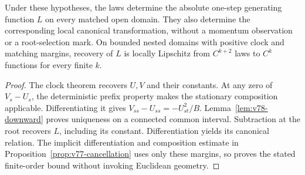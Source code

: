 \begin{theorem}
\label{thm:v78-generating}
Under these hypotheses, the laws determine the absolute one-step
generating function $L$ on every matched open domain.  They also determine
the corresponding local canonical transformation, without a momentum
observation or a root-selection mark.  On bounded nested domains with
positive clock and matching margins, recovery of $L$ is locally
Lipschitz from $C^{k+2}$ laws to $C^k$ functions for every finite $k$.
\end{theorem}
\begin{proof}
The clock theorem recovers $U,V$ and their constants.  At any zero of
$V_s-U_s$, the deterministic prefix property makes the stationary
composition applicable.  Differentiating it gives
$V_{ss}-U_{ss}=-U_{st}^2/B$.  Lemma~\ref{lem:v78-downward} proves
uniqueness on a connected common interval.  Subtraction at the root
recovers $L$, including its constant.  Differentiation yields its
canonical relation.  The implicit differentiation and composition
estimate in Proposition~\ref{prop:v77-cancellation} uses only these
margins, so proves the stated finite-order bound without invoking
Euclidean geometry.
\end{proof}
